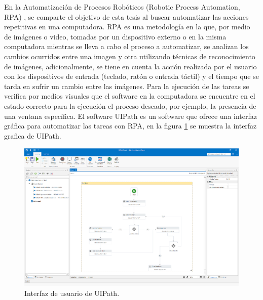 En la Automatizaci\'on de Procesos Rob\'oticos (Robotic Process Automation, RPA)
 \cite{Bataller2017}, se comparte el objetivo de esta tesis al buscar 
 automatizar las acciones repetitivas en una computadora. RPA es una 
 metodolog\'ia en la que, por medio de im\'agenes o video, tomadas por un 
 dispositivo externo o en la misma computadora mientras se lleva a cabo el 
 proceso a automatizar, se analizan los cambios ocurridos entre una imagen y 
 otra utilizando t\'ecnicas de reconocimiento de im\'agenes, adicionalmente, se 
 tiene en cuenta la acci\'on realizada por el usuario con los dispositivos de 
 entrada (teclado, rat\'on o entrada t\'actil) y el tiempo que se tarda en 
 sufrir un cambio entre las im\'agenes. Para la ejecuci\'on de las tareas se 
 verifica por medios visuales que el software en la computadora se encuentre 
 en el estado correcto para la ejecuci\'on el proceso deseado, por ejemplo, la 
 presencia de una ventana espec\'ifica. El software UIPath \cite{Dines2018}
 es un software que ofrece una interfaz gr\'afica para automatizar las tareas
 con RPA, en la figura \ref{fig:uipath} se muestra la interfaz grafica de UIPath.
 
\begin{figure}[h]
\centering
\includegraphics[width=0.8\columnwidth]{chap2/Imagenes/rpauipath.eps}
\caption{Interfaz de usuario de UIPath.}
\label{fig:uipath}
\end{figure}